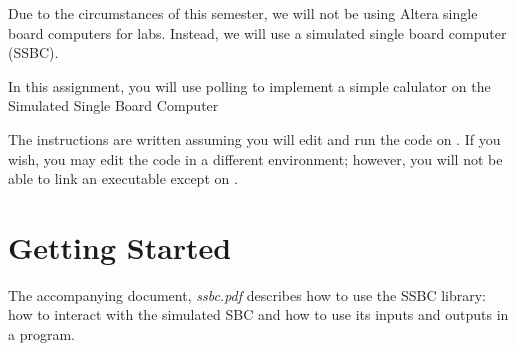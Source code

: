 


\usepackage{enumitem}
\usepackage{graphicx}
\usepackage{media9}
\usepackage{addfont}

\renewcommand{\labnumber}{\ssbcpollingnumber}
\renewcommand{\labname}{Polling to Detect Inputs on Simulated Hardware}
\renewcommand{\shortlabname}{ssbclab-polling}
\renewcommand{\collaborationrules}{\ssbcpollingcollaboration}
\renewcommand{\duedate}{\ssbcpollingdue}
\pagelayout

\labidentifier


Due to the circumstances of this semester, we will not be using Altera
single board computers for labs. Instead, we will use a simulated single
board computer (SSBC).

In this assignment, you will use polling to implement a simple calulator on the
Simulated Single Board Computer

The instructions are written assuming you will edit and run the code on
\runtimeenvironment. If you wish, you may edit the code in a different
environment; however, you will not be able to link an executable except on
\runtimeenvironment.

\section{Getting Started}

The accompanying document, \textit{ssbc.pdf} describes how to use the SSBC
library: how to interact with the simulated SBC and how to use its inputs and
outputs in a program.

